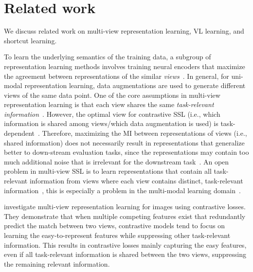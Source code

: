 
\section{Related work}
\label{sec:related-work}

We discuss related work on multi-view representation learning, \acl{VL} learning, and shortcut learning. 

  To learn the underlying semantics of the training data, a subgroup of representation learning methods involves training neural encoders that maximize the agreement between representations of the similar \textit{views}~\citep{oord2018representation, hjelm2019learning, chen2020simple, radford2021learning, bardes2022vicreg}. 
In general, for uni-modal representation learning, data augmentations are used to generate different views of the same data point.
One of the core assumptions in multi-view representation learning is that each view shares the same \emph{task-relevant information}~\citep{sridharan2008information, zhao2017multi, federici2020learning, tian2020contrastive, shwartz2023compress}.
However, the optimal view for contrastive \ac{SSL} (i.e., which information is shared among views/which data augmentation is used) is task-dependent~\citep{tian2020what, xiao2021what}.
Therefore, maximizing the \acf{MI} between representations of views (i.e., shared information) does not necessarily result in representations that generalize better to down-stream evaluation tasks, since the representations may contain too much additional noise that is irrelevant for the downstream task~\citep{tian2020what, tschannen2020on}.
An open problem in multi-view \ac{SSL} is to learn representations that contain all task-relevant information from views where each view contains distinct, task-relevant information~\citep{shwartz2023compress}, this is especially a problem in the multi-modal learning domain~\citep{zong2023self}.

\cite{chen2021intriguing} investigate multi-view representation learning for images using contrastive losses. 
They demonstrate that when multiple competing features exist that redundantly predict the match between two views, contrastive models tend to focus on learning the easy-to-represent features while suppressing other task-relevant information.
This results in contrastive losses mainly capturing the easy features, even if all task-relevant information is shared between the two views, suppressing the remaining relevant information.

